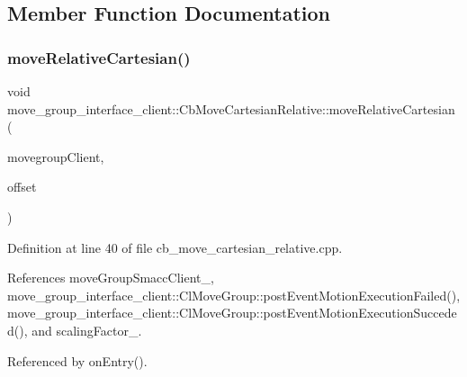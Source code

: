 \subsection{Member Function Documentation}
\mbox{\label{classmove__group__interface__client_1_1CbMoveCartesianRelative_a85b6b1c8738c372174dff8fd98ec1b7a}} 
\subsubsection{\texorpdfstring{move\+Relative\+Cartesian()}{moveRelativeCartesian()}}
{\footnotesize\ttfamily void move\+\_\+group\+\_\+interface\+\_\+client\+::\+Cb\+Move\+Cartesian\+Relative\+::move\+Relative\+Cartesian (\begin{DoxyParamCaption}\item[{moveit\+::planning\+\_\+interface\+::\+Move\+Group\+Interface $\ast$}]{movegroup\+Client,  }\item[{geometry\+\_\+msgs\+::\+Vector3 \&}]{offset }\end{DoxyParamCaption})}



Definition at line 40 of file cb\+\_\+move\+\_\+cartesian\+\_\+relative.\+cpp.



References move\+Group\+Smacc\+Client\+\_\+, move\+\_\+group\+\_\+interface\+\_\+client\+::\+Cl\+Move\+Group\+::post\+Event\+Motion\+Execution\+Failed(), move\+\_\+group\+\_\+interface\+\_\+client\+::\+Cl\+Move\+Group\+::post\+Event\+Motion\+Execution\+Succeded(), and scaling\+Factor\+\_\+.



Referenced by on\+Entry().


